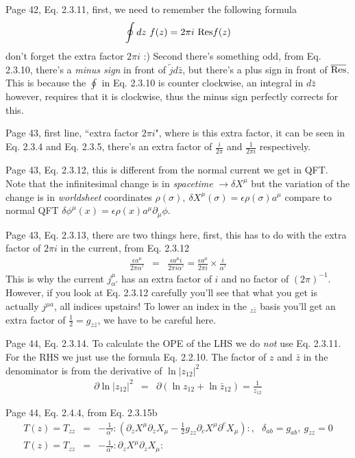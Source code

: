 \documentclass[aps,preprint,preprintnumbers,nofootinbib,showpacs,prd]{revtex4-1}
\newcommand{\nbea}{\begin{eqnarray*}}
\newcommand{\neea}{\end{eqnarray*}}
\begin{document}
Page 42, Eq. 2.3.11, first, we need to remember the following formula
%
\nbea
\oint dz~f(z) = {2\pi i}~ {\rm Res} f(z)
\neea
%
don't forget the extra factor $2\pi i$ :) Second there's something odd, from Eq. 2.3.10, there's a {\it minus sign} in front of $\tilde j d\bar z$, but there's a plus sign in front of ${\rm \overline {Res}}$. This is because the $\oint$ in Eq. 2.3.10 is counter clockwise, an integral in $d\bar z$ however, requires that it is clockwise, thus the minus sign perfectly corrects for this.

Page 43, first line, ``extra factor $2\pi i$", where is this extra factor, it can be seen in Eq. 2.3.4 and Eq. 2.3.5, there's an extra factor of $\frac{i}{2\pi}$ and $\frac{1}{2\pi i}$ respectively.

Page 43, Eq. 2.3.12, this is different from the normal current we get in QFT. Note that the infinitesimal change is in {\it spacetime} $\rightarrow \delta X^\mu$ but the variation of the change is in {\it worldsheet} coordinates $\rho(\sigma),~\delta X^\mu (\sigma) = \epsilon \rho(\sigma) a^{\mu}$ compare to normal QFT $\delta \phi^\mu (x) = \epsilon \rho(x) a^{\mu} \partial_\mu \phi$.

Page 43, Eq. 2.3.13, there are two things here, first, this has to do with the extra factor of $2\pi i$ in the current, from Eq. 2.3.12
%
\nbea
\frac{\epsilon a^\mu}{2 \pi \alpha'} & = & \frac{\epsilon a^\mu i}{2 \pi i \alpha'} = \frac{\epsilon a^\mu}{2 \pi i} \times \frac{i}{\alpha '}
\neea
%
This is why the current $j^\mu_{\alpha'}$ has an extra factor of $i$ and no factor of $(2\pi)^{-1}$. However, if you look at Eq. 2.3.12 carefully you'll see that what you get is actually $j^{\mu a}$, all indices upstairs! To lower an index in the $_{z\bar z}$ basis you'll get an extra factor of $\frac{1}{2} = g_{z \bar z}$, we have to be careful here.

Page 44, Eq. 2.3.14. To calculate the OPE of the LHS we do {\it not} use Eq. 2.3.11. For the RHS we just use the formula Eq. 2.2.10. The factor of $z$ and $\bar z$ in the denominator is from the derivative of $\ln|z_{12}|^2$
%
\nbea
\partial \ln|z_{12}|^2 & = & \partial (\ln z_{12} + \ln \bar z_{12}) = \frac{1}{z_{12}}
\neea
%

Page 44, Eq. 2.4.4, from Eq. 2.3.15b
%
\nbea
T(z) = T_{zz} & = & -\frac{1}{\alpha'} : \left ( \partial_z X^\mu \partial_z X_\mu - \frac{1}{2} g_{zz} \partial_cX^\mu \partial^c X_\mu \right ): , ~~~ \delta_{ab} = g_{ab},~g_{zz} = 0 \\
T(z) = T_{zz} & = & -\frac{1}{\alpha'} : \partial_z X^\mu \partial_z X_\mu :
\neea
%
\end{document}
